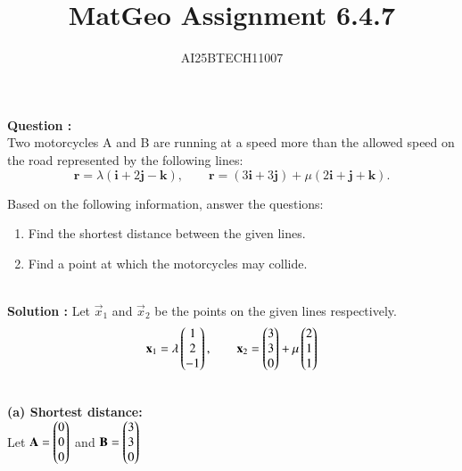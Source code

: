 \documentclass[journal]{IEEEtran}
\begin{document}

\vspace{3cm}

\title{MatGeo Assignment 6.4.7}
\author{AI25BTECH11007}
 \maketitle
{\let\newpage\relax\maketitle}

\renewcommand{\thefigure}{\theenumi}
\renewcommand{\thetable}{\theenumi}
\setlength{\intextsep}{10pt} %


\renewcommand{\thetable}{\theenumi}
\noindent
\textbf{Question :}\\
Two motorcycles A and B are running at a speed more than the allowed speed on
the road represented by the following lines:
\[
\mathbf{r} = \lambda(\mathbf{i} + 2\mathbf{j} - \mathbf{k}), \qquad
\mathbf{r} = (3\mathbf{i} + 3\mathbf{j}) + \mu(2\mathbf{i} + \mathbf{j} + \mathbf{k}).
\]

Based on the following information, answer the questions:

\begin{enumerate}
    \item Find the shortest distance between the given lines.
    \item Find a point at which the motorcycles may collide.
\end{enumerate}

\noindent\\
\textbf{Solution :}
Let $\vec{x}_1$ and $\vec{x}_2$ be the points on the given lines respectively.
\[
\mathbf{x}_1 = \lambda\begin{pmatrix}1\\2\\-1\end{pmatrix}, \qquad 
\mathbf{x}_2 = \begin{pmatrix}3\\3\\0\end{pmatrix} + \mu\begin{pmatrix}2\\1\\1\end{pmatrix}
\]

\noindent\\
\textbf{(a) Shortest distance:}\\
Let $\mathbf{A} = \begin{pmatrix}0\\0\\0\end{pmatrix}$ and $\mathbf{B} = \begin{pmatrix}3\\3\\0\end{pmatrix}$
\end{document}
